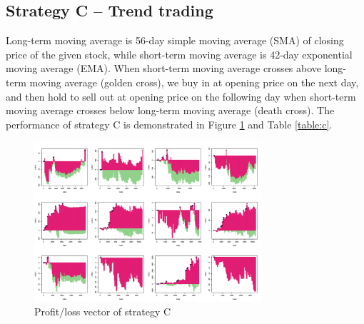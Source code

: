 \documentclass[12pt, letterpaper, oneside]{article}
\begin{document}
\subsection{Strategy C -- Trend trading}
Long-term moving average is 56-day simple moving average (SMA) of closing price of the given stock, while short-term moving average is 42-day exponential moving average (EMA). When short-term moving average crosses above long-term moving average (golden cross), we buy in at opening price on the next day, and then hold to sell out at opening price on the following day when short-term moving average crosses below long-term moving average (death cross). The performance of strategy C is demonstrated in Figure \ref{fig:c} and Table \ref{table:c}.

\begin{figure}[h]
    \centering
    \includegraphics[width=0.75\textwidth]{sc_pl}
    \caption{Profit/loss vector of strategy C}
    \label{fig:c}
\end{figure}
\end{document}
